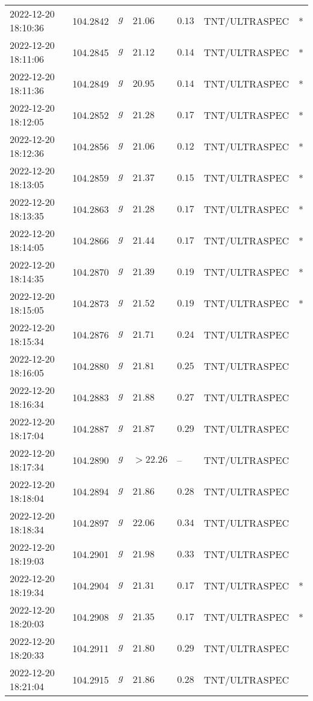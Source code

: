 \documentclass{nature_plusfigure}
\begin{document}
\begin{supplement}
\begin{center}
\begin{longtable}{lllllll}
2022-12-20 18:10:36 & 104.2842 & $g$ & $21.06$ & $0.13$ & TNT/ULTRASPEC & * \\ 
2022-12-20 18:11:06 & 104.2845 & $g$ & $21.12$ & $0.14$ & TNT/ULTRASPEC & * \\ 
2022-12-20 18:11:36 & 104.2849 & $g$ & $20.95$ & $0.14$ & TNT/ULTRASPEC & * \\ 
2022-12-20 18:12:05 & 104.2852 & $g$ & $21.28$ & $0.17$ & TNT/ULTRASPEC & * \\ 
2022-12-20 18:12:36 & 104.2856 & $g$ & $21.06$ & $0.12$ & TNT/ULTRASPEC & * \\ 
2022-12-20 18:13:05 & 104.2859 & $g$ & $21.37$ & $0.15$ & TNT/ULTRASPEC & * \\ 
2022-12-20 18:13:35 & 104.2863 & $g$ & $21.28$ & $0.17$ & TNT/ULTRASPEC & * \\ 
2022-12-20 18:14:05 & 104.2866 & $g$ & $21.44$ & $0.17$ & TNT/ULTRASPEC & * \\ 
2022-12-20 18:14:35 & 104.2870 & $g$ & $21.39$ & $0.19$ & TNT/ULTRASPEC & * \\ 
2022-12-20 18:15:05 & 104.2873 & $g$ & $21.52$ & $0.19$ & TNT/ULTRASPEC & * \\ 
2022-12-20 18:15:34 & 104.2876 & $g$ & $21.71$ & $0.24$ & TNT/ULTRASPEC &  \\ 
2022-12-20 18:16:05 & 104.2880 & $g$ & $21.81$ & $0.25$ & TNT/ULTRASPEC &  \\ 
2022-12-20 18:16:34 & 104.2883 & $g$ & $21.88$ & $0.27$ & TNT/ULTRASPEC &  \\ 
2022-12-20 18:17:04 & 104.2887 & $g$ & $21.87$ & $0.29$ & TNT/ULTRASPEC &  \\ 
2022-12-20 18:17:34 & 104.2890 & $g$ & $>22.26$ & -- & TNT/ULTRASPEC &  \\ 
2022-12-20 18:18:04 & 104.2894 & $g$ & $21.86$ & $0.28$ & TNT/ULTRASPEC &  \\ 
2022-12-20 18:18:34 & 104.2897 & $g$ & $22.06$ & $0.34$ & TNT/ULTRASPEC &  \\ 
2022-12-20 18:19:03 & 104.2901 & $g$ & $21.98$ & $0.33$ & TNT/ULTRASPEC &  \\ 
2022-12-20 18:19:34 & 104.2904 & $g$ & $21.31$ & $0.17$ & TNT/ULTRASPEC & * \\ 
2022-12-20 18:20:03 & 104.2908 & $g$ & $21.35$ & $0.17$ & TNT/ULTRASPEC & * \\ 
2022-12-20 18:20:33 & 104.2911 & $g$ & $21.80$ & $0.29$ & TNT/ULTRASPEC &  \\ 
2022-12-20 18:21:04 & 104.2915 & $g$ & $21.86$ & $0.28$ & TNT/ULTRASPEC &  \\ 

\end{longtable}
\end{center}
\end{supplement}
\end{document}
